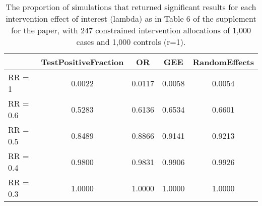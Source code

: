 \documentclass{article}\usepackage[]{graphicx}\usepackage[]{color}
\begin{document}
\FloatBarrier





\begin{table}[ht]
\centering
\begin{tabular}{l|cccc}
  \hline
 & TestPositiveFraction & OR & GEE & RandomEffects \\ 
  \hline
RR = 1 & 0.0022 & 0.0117 & 0.0058 & 0.0054 \\ 
  RR = 0.6 & 0.5283 & 0.6136 & 0.6534 & 0.6601 \\ 
  RR = 0.5 & 0.8489 & 0.8866 & 0.9141 & 0.9213 \\ 
  RR = 0.4 & 0.9800 & 0.9831 & 0.9906 & 0.9926 \\ 
  RR = 0.3 & 1.0000 & 1.0000 & 1.0000 & 1.0000 \\ 
   \hline
\end{tabular}
\caption{The proportion of simulations that returned significant results for each intervention effect of interest (lambda) as in Table 6 of the supplement for the paper, with 247 constrained intervention allocations of 1,000 cases and 1,000 controls (r=1).} 
\end{table}
\end{document}

